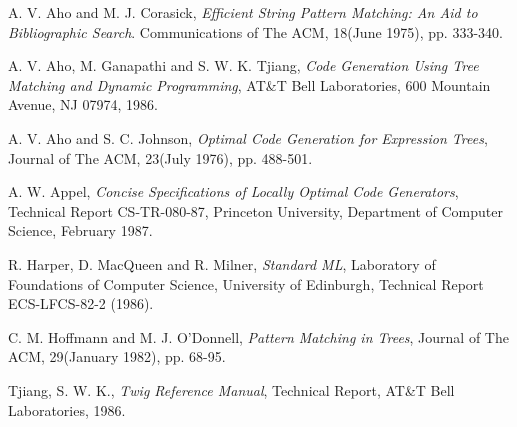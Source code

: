 \begin{thebibliography}{99}

 {\sc A. V. Aho and M. J. Corasick},
{\em Efficient String Pattern Matching: An Aid to Bibliographic Search}.
Communications of The ACM, 18(June 1975), pp. 333-340.

 {\sc A. V. Aho, M. Ganapathi and S. W. K.
Tjiang}, {\em Code Generation Using Tree Matching and Dynamic Programming},
AT\&T Bell Laboratories, 600 Mountain Avenue, NJ 07974, 1986.

 {\sc A. V. Aho and S. C. Johnson}, {\em Optimal Code
Generation for Expression Trees}, Journal of The ACM, 23(July 1976),
pp. 488-501.

 {\sc A. W. Appel}, {\em Concise Specifications of Locally
Optimal Code Generators}, Technical Report CS-TR-080-87, Princeton
University, Department of Computer Science, February 1987.

 {\sc R. Harper, D. MacQueen and R. Milner},
{\em Standard ML}, Laboratory of Foundations of Computer Science,
University of Edinburgh, Technical Report ECS-LFCS-82-2 (1986).

 {\sc C. M. Hoffmann and M. J. O'Donnell},
{\em Pattern Matching in Trees}, Journal of The ACM, 29(January 1982),
pp. 68-95.

 {\sc Tjiang, S. W. K.}, {\em Twig Reference Manual},
Technical Report, AT\&T Bell Laboratories, 1986.

\end{thebibliography}


